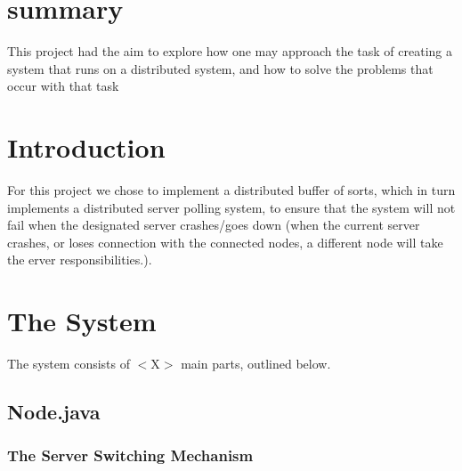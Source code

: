 \documentclass[12pt]{article}
\begin{document}
\section{summary} %
\label{sec:summary}
This project had the aim to explore how one may approach the task of creating a system that runs on a distributed system, and how to solve the problems that occur with that task

\section{Introduction} %
\label{sec:introduction}
For this project we chose to implement a distributed buffer of sorts, which in turn implements a distributed server polling system, to ensure that the system will not fail when the designated server crashes/goes down (when the current server crashes, or loses connection with the connected nodes, a different node will take the erver responsibilities.).

\section{The System} %
\label{sec:the_system}
The system consists of $<$X$>$ main parts, outlined below.

\subsection{Node.java} %
\label{sub:node_java}



\subsubsection{The Server Switching Mechanism} %
\label{ssub:the_server_switching_mechanism}


\end{document}
